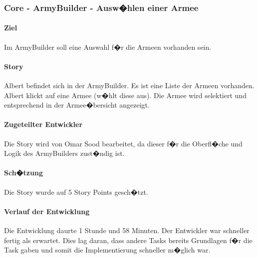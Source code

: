 \documentclass[12pt, titlepage]{scrartcl}
\begin{document}
		\subsubsection{Core - ArmyBuilder - Ausw�hlen einer Armee}
		\paragraph{Ziel} Im ArmyBuilder soll eine Auswahl f�r die Armeen vorhanden sein.
		\paragraph{Story} Albert befindet sich in der ArmyBuilder. Es ist eine Liste der Armeen vorhanden. Albert klickt auf eine Armee (w�hlt diese aus). Die Armee wird selektiert und entsprechend in der Armee�bersicht angezeigt.
		\paragraph{Zugeteilter Entwickler} Die Story wird von Omar Sood bearbeitet, da dieser f�r die Oberfl�che und Logik des ArmyBuilders zust�ndig ist.
		\paragraph{Sch�tzung}
		Die Story wurde auf 5 Story Points gesch�tzt.
		\paragraph{Verlauf der Entwicklung} 
		Die Entwicklung daurte 1 Stunde und 58 Minuten. Der Entwickler war schneller fertig als erwartet. Dies lag daran, dass andere Tasks bereits Grundlagen f�r die Task gaben und somit die Implementierung schneller m�glich war.
		
		\newpage
		
\end{document}
